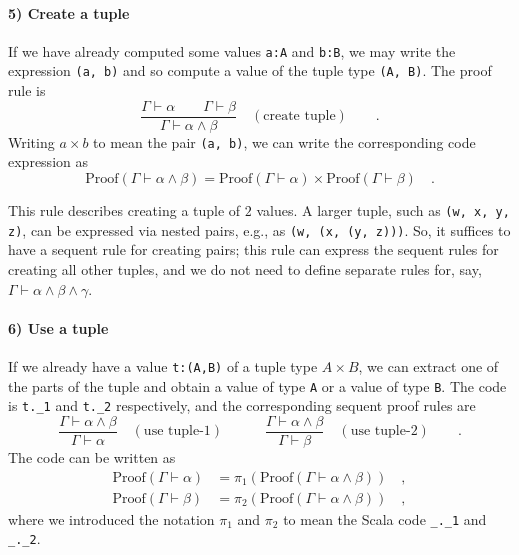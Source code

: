 \paragraph{5) Create a tuple}

If we have already computed some values \lstinline!a:A! and \lstinline!b:B!,
we may write the expression \lstinline!(a, b)! and so compute a value
of the tuple type \lstinline!(A, B)!. The proof rule is
\[
\frac{\Gamma\vdash\alpha\quad\quad\Gamma\vdash\beta}{\Gamma\vdash\alpha\wedge\beta}\quad(\text{create tuple})\quad\quad.
\]
Writing $a\times b$ to mean the pair \lstinline!(a, b)!, we can
write the corresponding code expression as
\[
\text{Proof}\left(\Gamma\vdash\alpha\wedge\beta\right)=\text{Proof}\left(\Gamma\vdash\alpha\right)\times\text{Proof}\left(\Gamma\vdash\beta\right)\quad.
\]

This rule describes creating a tuple of $2$ values. A larger tuple,
such as \lstinline!(w, x, y, z)!, can be expressed via nested pairs,
e.g., as \lstinline!(w, (x, (y, z)))!. So, it suffices to have a
sequent rule for creating pairs; this rule can express the sequent
rules for creating all other tuples, and we do not need to define
separate rules for, say, $\Gamma\vdash\alpha\wedge\beta\wedge\gamma$.

\paragraph{6) Use a tuple}

If we already have a value \lstinline!t:(A,B)! of a tuple type $A\times B$,
we can extract one of the parts of the tuple and obtain a value of
type \lstinline!A! or a value of type \lstinline!B!. The code is
\lstinline!t._1! and \lstinline!t._2! respectively, and the corresponding
sequent proof rules are
\[
\frac{\Gamma\vdash\alpha\wedge\beta}{\Gamma\vdash\alpha}\quad(\text{use tuple-}1)\quad\quad\quad\frac{\Gamma\vdash\alpha\wedge\beta}{\Gamma\vdash\beta}\quad(\text{use tuple-}2)\quad\quad.
\]
The code can be written as
\begin{align*}
\text{Proof}\left(\Gamma\vdash\alpha\right) & =\pi_{1}\left(\text{Proof}\left(\Gamma\vdash\alpha\wedge\beta\right)\right)\quad,\\
\text{Proof}\left(\Gamma\vdash\beta\right) & =\pi_{2}\left(\text{Proof}\left(\Gamma\vdash\alpha\wedge\beta\right)\right)\quad,
\end{align*}
where we introduced the notation $\pi_{1}$ and $\pi_{2}$ to mean
the Scala code \lstinline!_._1! and \lstinline!_._2!.

